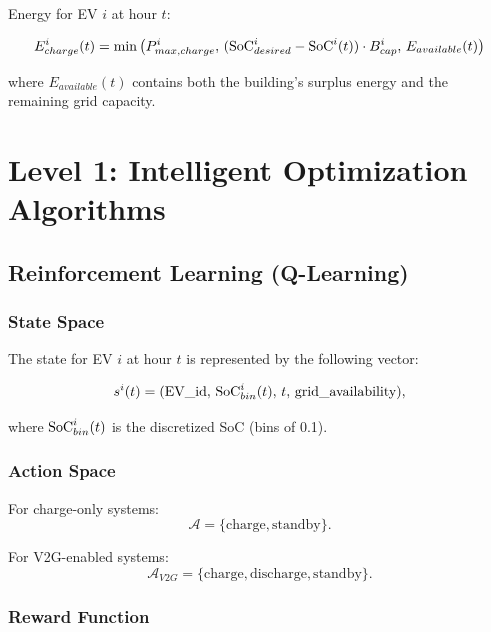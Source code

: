 Energy for EV $i$ at hour $t$:

\begin{equation}
E_{charge}^i(t) = \min\left( P_{max,charge}^{i}, \, (\text{SoC}_{desired}^i - \text{SoC}^i(t)) \cdot B_{cap}^{i}, \, E_{available}(t) \right)
\end{equation}

where $E_{available}(t)$ contains both the building's surplus energy and the remaining grid capacity.

\section{Level 1: Intelligent Optimization Algorithms}
\label{sec:level2_models}

\subsection{Reinforcement Learning (Q-Learning)}
\label{subsec:rl_model}

\subsubsection{State Space}

The state for EV $i$ at hour $t$ is represented by the following vector:

\begin{equation}
s^i(t) = (\text{EV\_id}, \, \text{SoC}_{bin}^i(t), \, t, \, \text{grid\_availability}),
\end{equation}

where $\text{SoC}_{bin}^i(t)$ is the discretized SoC (bins of 0.1).

\subsubsection{Action Space}

For charge-only systems:
\begin{equation}
\mathcal{A} = \{\text{charge}, \text{standby}\}.
\end{equation}

For V2G-enabled systems:
\begin{equation}
\mathcal{A}_{V2G} = \{\text{charge}, \text{discharge}, \text{standby}\}.
\end{equation}

\subsubsection{Reward Function}

